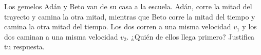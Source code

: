 Los gemelos Adán y Beto van de su casa a la escuela. Adán, corre la mitad del trayecto y camina la otra mitad, mientras que Beto corre la mitad del tiempo y camina la otra mitad del tiempo. Los dos corren a una misma velocidad $v_1$ y los dos caminan a una misma velocidad $v_2.$ ¿Quién de ellos llega primero? Justifica tu respuesta.